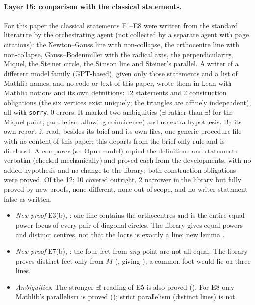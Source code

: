 \documentclass[11pt]{article}
\theoremstyle{definition}
\theoremstyle{remark}
\newcommand{\lean}[1]{\texttt{#1}}
\begin{document}
\paragraph{Layer 15: comparison with the classical statements.} For this paper the classical
statements E1--E8 were written from the standard literature by the orchestrating agent (not collected
by a separate agent with page citations): the Newton--Gauss line with non-collapse, the orthocentre line
with non-collapse, Gauss--Bodenmiller with the radical axis, the perpendicularity, Miquel, the Steiner
circle, the Simson line and Steiner's parallel. A writer of a different model family (GPT-based), given
only those statements and a list of Mathlib names, and no code or text of this paper, wrote them in
Lean with Mathlib notions and its own definitions: 12 statements and 2 construction obligations (the
six vertices exist uniquely; the triangles are affinely independent), all with \lean{sorry}, 0 errors.
It marked two ambiguities ($\exists$ rather than $\exists!$ for the Miquel point; parallelism allowing
coincidence) and no extra hypothesis. By its own report it read, besides its brief and its own files,
one generic procedure file with no content of this paper; this departs from the brief-only rule and is
disclosed. A comparer (an Opus model) copied the definitions and statements verbatim (checked
mechanically) and proved each from the developments, with no added hypothesis and no change to the
library; both construction obligations were proved. Of the 12: 10 covered outright, 2 narrower in
the library but fully proved by new proofs, none different, none out of scope, and no writer statement
false as written.
\begin{itemize}
\item \emph{New proof} E3(b), : one line contains the orthocentres and
is the entire equal-power locus of every pair of diagonal circles. The library gives equal powers and
distinct centres, not that the locus is exactly a line; new lemma
.
\item \emph{New proof} E7(b), : the four feet from \emph{any} point are
not all equal. The library proves distinct feet only from $M$ (, giving
); a common foot would lie on three lines.
\item \emph{Ambiguities.} The stronger $\exists!$ reading of E5 is also proved
(). For E8 only Mathlib's parallelism is proved
(); strict parallelism (distinct lines) is not.
\end{itemize}
\end{document}
